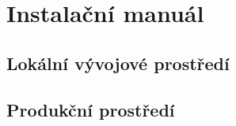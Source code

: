 \chapter{Instalační manuál}
\label{append:instalace}
\section{Lokální vývojové prostředí}
\label{append:instalace-local}

\section{Produkční prostředí}
\label{append:instalace-production}